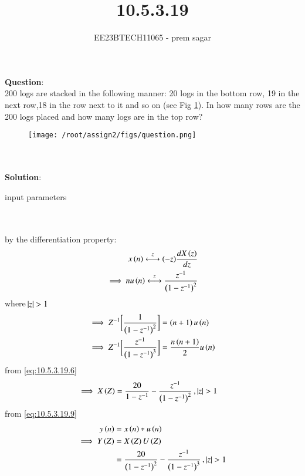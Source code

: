 \documentclass[journal,12pt,twocolumn]{IEEEtran}
\theoremstyle{remark}
\begin{document}

\vspace{3cm}

\title{10.5.3.19}
\author{EE23BTECH11065 - prem sagar}
\maketitle
\newpage

\bigskip 

\renewcommand{\thefigure}{\arabic{figure}}
\renewcommand{\thetable}{\arabic{table}}
\textbf{Question}:\\  200 logs are stacked in the following manner: 20 logs in the bottom row, 19 in the next row,18 in the row next to it and so on (see Fig \ref{fig:10.5.3.19.q}). In how many rows are the 200 logs placed and how many logs are in the top row?
\begin{figure}[h]
    \centering
    \texttt{[image: /root/assign2/figs/question.png]}
    \caption{ }
    \label{fig:10.5.3.19.q}
\end{figure}
\\\\\textbf{Solution}:
\begin{table}[!ht]
  \def\arraystretch{1.5}
  \centering
  \renewcommand\thetable{1}
  
  \caption{input parameters}
  \label{tab:10.5.3.19}
  \end{table}
\\\\by the differentiation property:
\\\begin{align}
 x\left(n\right)\overset{z}{\longleftrightarrow} (-z)\frac{dX\left(z\right)}{dz}
 \\\implies n u\left(n\right)\overset{z}{\longleftrightarrow} \frac{z^{-1}}{\left(1-z^{-1}\right)^2}
 \label{eq:10.5.3.19.6}
 \end{align}
 where\,$\left\vert z\right\vert>1$
 \begin{align}
 \implies Z^{-1}\biggl[\frac{1}{\left(1-z^{-1}\right)^2}\biggr]&=\left(n+1\right)u\left(n\right)
\\\implies Z^{-1}\biggl[\frac{z^{-1}}{\left(1-z^{-1}\right)^3}\biggr]&=\frac{n\left(n+1\right)}{2}u\left(n\right)
\label{eq:10.5.3.19.8}
 \end{align}
 from \eqref{eq:10.5.3.19.6}
\begin{align} 
\implies X\left(Z\right)&=\frac{20}{1-z^{-1}}-\frac{z^{-1}}{\left(1-z^{-1}\right)^2}\,,\left\vert z\right\vert>1
\label{eq:10.5.3.19.9}
\end{align}
from \eqref{eq:10.5.3.19.9}
\begin{align}
y\left(n\right)&=x\left(n\right)*u\left(n\right)
\\\implies Y\left(Z\right)&=X\left(Z\right)U\left(Z\right)
\\&=\frac{20}{\left(1-z^{-1}\right)^2}-\frac{z^{-1}}{\left(1-z^{-1}\right)^3}\,,\left\vert z\right\vert>1
\end{align}
\end{document}
